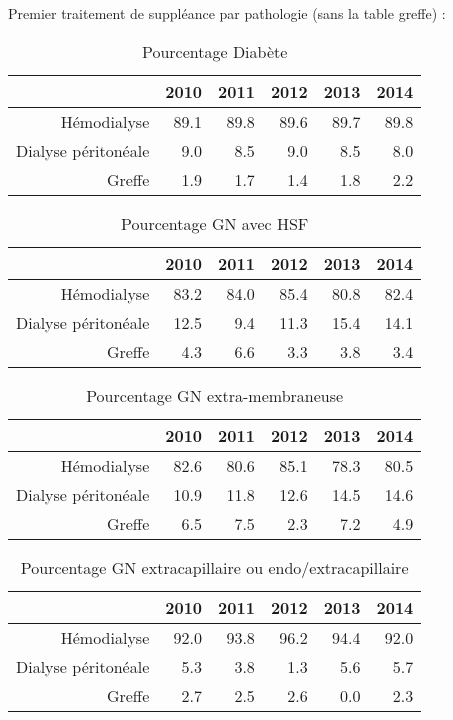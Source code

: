 \documentclass[11pt,a4paper]{article}\usepackage[]{graphicx}\usepackage[]{color}
\begin{document}
Premier traitement de suppléance par pathologie (sans la table greffe) :

\begin{table}[H]
\centering
\begin{tabular}{rrrrrr}
  \hline
 & 2010 & 2011 & 2012 & 2013 & 2014 \\ 
  \hline
Hémodialyse & 89.1 & 89.8 & 89.6 & 89.7 & 89.8 \\ 
  Dialyse péritonéale & 9.0 & 8.5 & 9.0 & 8.5 & 8.0 \\ 
  Greffe & 1.9 & 1.7 & 1.4 & 1.8 & 2.2 \\ 
   \hline
\end{tabular}
\caption{Pourcentage Diabète} 
\end{table}
\begin{table}[H]
\centering
\begin{tabular}{rrrrrr}
  \hline
 & 2010 & 2011 & 2012 & 2013 & 2014 \\ 
  \hline
Hémodialyse & 83.2 & 84.0 & 85.4 & 80.8 & 82.4 \\ 
  Dialyse péritonéale & 12.5 & 9.4 & 11.3 & 15.4 & 14.1 \\ 
  Greffe & 4.3 & 6.6 & 3.3 & 3.8 & 3.4 \\ 
   \hline
\end{tabular}
\caption{Pourcentage GN avec HSF} 
\end{table}
\begin{table}[H]
\centering
\begin{tabular}{rrrrrr}
  \hline
 & 2010 & 2011 & 2012 & 2013 & 2014 \\ 
  \hline
Hémodialyse & 82.6 & 80.6 & 85.1 & 78.3 & 80.5 \\ 
  Dialyse péritonéale & 10.9 & 11.8 & 12.6 & 14.5 & 14.6 \\ 
  Greffe & 6.5 & 7.5 & 2.3 & 7.2 & 4.9 \\ 
   \hline
\end{tabular}
\caption{Pourcentage GN extra-membraneuse} 
\end{table}
\begin{table}[H]
\centering
\begin{tabular}{rrrrrr}
  \hline
 & 2010 & 2011 & 2012 & 2013 & 2014 \\ 
  \hline
Hémodialyse & 92.0 & 93.8 & 96.2 & 94.4 & 92.0 \\ 
  Dialyse péritonéale & 5.3 & 3.8 & 1.3 & 5.6 & 5.7 \\ 
  Greffe & 2.7 & 2.5 & 2.6 & 0.0 & 2.3 \\ 
   \hline
\end{tabular}
\caption{Pourcentage GN extracapillaire ou endo/extracapillaire} 
\end{table}
\end{document}
